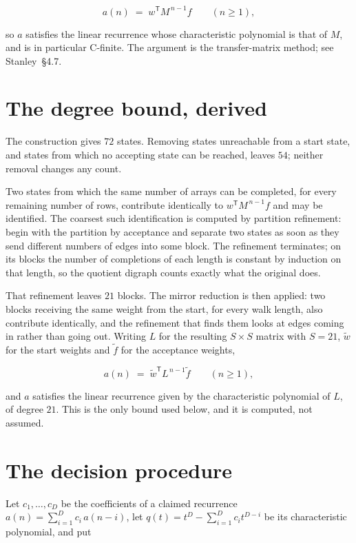 \documentclass[11pt]{article}
\theoremstyle{definition}
\begin{document}
\[a(n) \;=\; w^{\mathsf T} M^{\,n-1} f \qquad (n \ge 1),\]

so $a$ satisfies the linear recurrence whose characteristic polynomial is that of $M$, and is in particular C-finite. The argument is the transfer-matrix method; see Stanley~\S4.7.

\section{The degree bound, derived}

The construction gives $72$ states. Removing states unreachable from a start state, and states from which no accepting state can be reached, leaves $54$; neither removal changes any count.

Two states from which the same number of arrays can be completed, for every remaining number of rows, contribute identically to $w^{\mathsf T}M^{\,n-1}f$ and may be identified. The coarsest such identification is computed by partition refinement: begin with the partition by acceptance and separate two states as soon as they send different numbers of edges into some block. The refinement terminates; on its blocks the number of completions of each length is constant by induction on that length, so the quotient digraph counts exactly what the original does.

That refinement leaves $21$ blocks. The mirror reduction is then applied: two blocks receiving the same weight from the start, for every walk length, also contribute identically, and the refinement that finds them looks at edges coming in rather than going out. Writing $L$ for the resulting $S \times S$ matrix with $S = 21$, $\tilde w$ for the start weights and $\tilde f$ for the acceptance weights,

\[a(n) \;=\; \tilde w^{\mathsf T} L^{\,n-1} \tilde f \qquad (n \ge 1),\]

and $a$ satisfies the linear recurrence given by the characteristic polynomial of $L$, of degree $21$. This is the only bound used below, and it is computed, not assumed.

\section{The decision procedure}

Let $c_1,\dots,c_D$ be the coefficients of a claimed recurrence $a(n) = \sum_{i=1}^{D} c_i\,a(n-i)$, let $q(t) = t^{D} - \sum_{i=1}^{D} c_i t^{D-i}$ be its characteristic polynomial, and put
\end{document}
